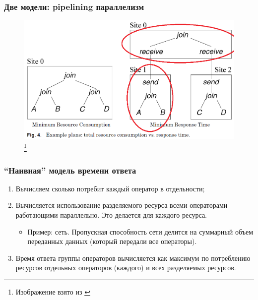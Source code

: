 \documentclass{beamer}
\begin{document}
\begin{frame}
	\frametitle{Две модели: pipelining параллелизм}
	
	\begin{figure}[htb]
		\includegraphics[width=\textwidth,height=0.80\textheight,keepaspectratio]{kossman-3b.png} 
		\footnote{\tiny{Изображение взято из \cite{Kossmann2000}}}
	\end{figure}
	
\end{frame}

\begin{frame}
\frametitle{``Наивная'' модель времени ответа}

\begin{enumerate}
  \setlength\itemsep{1em}
  \item Вычисляем сколько потребит каждый оператор в отдельности;
  \item Вычисляется использование разделяемого ресурса всеми операторами работающими параллельно. Это делается для каждого ресурса.
  \begin{itemize}
    \item Пример: сеть. Пропускная способность сети делится на суммарный объем переданных данных (который передали все операторы).
  \end{itemize}
  \item  Время ответа группы операторов вычисляется как \alert{максимум} по потреблению ресурсов отдельных операторов (каждого) и всех разделяемых ресурсов.
\end{enumerate}

\end{frame}
\end{document}
